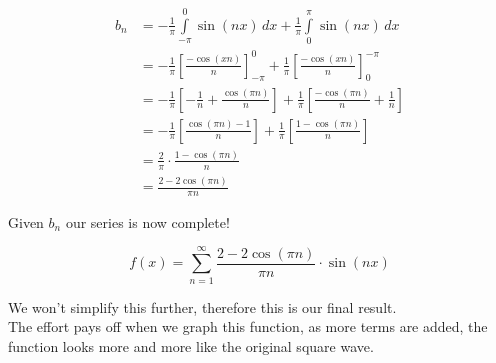 \documentclass[a4paper]{article}
\newcommand{\integral}[4]{\int\limits_{#1}^{#2} #3\,d#4}
\begin{document}
\begin{align*}
    b_n &=
    -\frac{1}{\pi} \integral{-\pi}{0}{\sin(nx)}{x} +
    \frac{1}{\pi} \integral{0}{\pi}{\sin(nx)}{x} \\
    &= -\frac{1}{\pi} {\left[\frac{-\cos(xn)}{n}\right]}_{-\pi}^{0} +
    \frac{1}{\pi} {\left[\frac{-\cos(xn)}{n}\right]}_{0}^{-\pi} \\
    &= -\frac{1}{\pi} \left[-\frac{1}{n}+\frac{\cos(\pi n)}{n}\right] +
    \frac{1}{\pi} \left[\frac{-\cos(\pi n)}{n}+\frac{1}{n}\right] \\
    &= -\frac{1}{\pi} \left[\frac{\cos(\pi n)-1}{n}\right] +
    \frac{1}{\pi} \left[\frac{1-\cos(\pi n)}{n}\right] \\
    &= \frac{2}{\pi} \cdot \frac{1-\cos(\pi n)}{n} \\
    &= \frac{2-2\cos(\pi n)}{\pi n}
\end{align*}

Given \(b_n\) our series is now complete!

\[
    f(x)=\sum_{n=1}^{\infty} \frac{2-2\cos(\pi n)}{\pi n} \cdot \sin(nx)
\]

We won't simplify this further, therefore this is our final result. \\
The effort pays off when we graph this function, as more terms are added, the function looks more and more like the original square wave.
\end{document}
